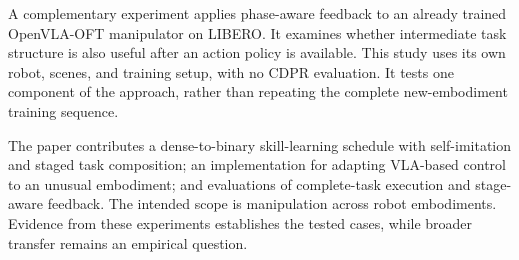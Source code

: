 A complementary experiment applies phase-aware feedback to an already trained OpenVLA-OFT manipulator on LIBERO. It examines whether intermediate task structure is also useful after an action policy is available. This study uses its own robot, scenes, and training setup, with no CDPR evaluation. It tests one component of the approach, rather than repeating the complete new-embodiment training sequence.

The paper contributes a dense-to-binary skill-learning schedule with self-imitation and staged task composition; an implementation for adapting VLA-based control to an unusual embodiment; and evaluations of complete-task execution and stage-aware feedback. The intended scope is manipulation across robot embodiments. Evidence from these experiments establishes the tested cases, while broader transfer remains an empirical question.
